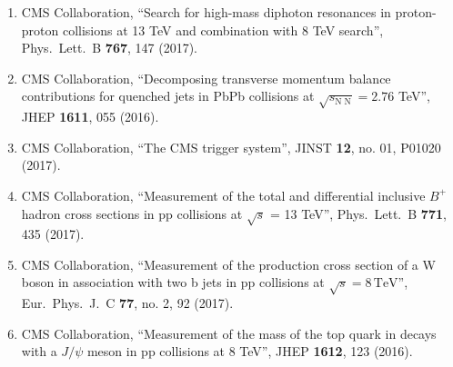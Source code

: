 \begin{itemize}
\begin{enumerate}
\item CMS Collaboration, ``Search for high-mass diphoton resonances in proton-proton collisions at 13 TeV and combination with 8 TeV search'', Phys.\ Lett.\ B {\bf 767}, 147 (2017).

\item CMS Collaboration, ``Decomposing transverse momentum balance contributions for quenched jets in PbPb collisions at $ \sqrt{s_{\mathrm{N}\;\mathrm{N}}}=2.76 $ TeV'', JHEP {\bf 1611}, 055 (2016).

\item CMS Collaboration, ``The CMS trigger system'', JINST {\bf 12}, no. 01, P01020 (2017).

\item CMS Collaboration, ``Measurement of the total and differential inclusive $B^+$ hadron cross sections in pp collisions at $\sqrt{s}$ = 13 TeV'', Phys.\ Lett.\ B {\bf 771}, 435 (2017).

\item CMS Collaboration, ``Measurement of the production cross section of a W boson in association with two b jets in pp collisions at $\sqrt{s} = 8{\,\mathrm{{TeV}}} $'', Eur.\ Phys.\ J.\ C {\bf 77}, no. 2, 92 (2017).

\item CMS Collaboration, ``Measurement of the mass of the top quark in decays with a $J/\psi$ meson in pp collisions at 8 TeV'', JHEP {\bf 1612}, 123 (2016).


\end{enumerate}
\end{itemize}
